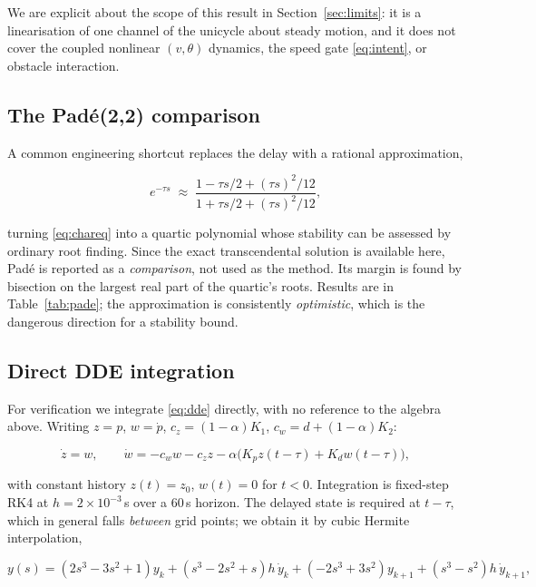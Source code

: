 \documentclass[11pt,a4paper]{article}
\theoremstyle{plain}
\theoremstyle{definition}
\begin{document}
We are explicit about the scope of this result in
Section~\ref{sec:limits}: it is a linearisation of one channel of the
unicycle about steady motion, and it does not cover the coupled
nonlinear $(v, \theta)$ dynamics, the speed gate \eqref{eq:intent}, or
obstacle interaction.

\subsection{The Pad\'e(2,2) comparison}
\label{sec:pade}

A common engineering shortcut replaces the delay with a rational
approximation,

\begin{equation}
e^{-\tau s} \;\approx\;
\frac{1 - \tau s/2 + (\tau s)^{2}/12}{1 + \tau s/2 + (\tau s)^{2}/12},
\label{eq:pade}
\end{equation}

turning \eqref{eq:chareq} into a quartic polynomial whose stability can
be assessed by ordinary root finding. Since the exact transcendental
solution is available here, Pad\'e is reported as a \emph{comparison},
not used as the method. Its margin is found by bisection on the largest
real part of the quartic's roots. Results are in
Table~\ref{tab:pade}; the approximation is consistently
\emph{optimistic}, which is the dangerous direction for a stability
bound.

\subsection{Direct DDE integration}
\label{sec:ddeint}

For verification we integrate \eqref{eq:dde} directly, with no reference
to the algebra above. Writing $z = p$, $w = \dot p$,
$c_z = (1-\alpha)K_1$, $c_w = d + (1-\alpha)K_2$:

\begin{equation}
\dot z = w,
\qquad
\dot w = -c_w w - c_z z - \alpha\bigl(K_p z(t-\tau) + K_d w(t-\tau)\bigr),
\end{equation}

with constant history $z(t) = z_0$, $w(t) = 0$ for $t < 0$.
Integration is fixed-step RK4 at $h = 2\times10^{-3}$\,s over a $60$\,s
horizon. The delayed state is required at $t - \tau$, which in general
falls \emph{between} grid points; we obtain it by cubic Hermite
interpolation,

\begin{equation}
y(s) = (2s^3 - 3s^2 + 1)y_k + (s^3 - 2s^2 + s)h\,\dot y_k
     + (-2s^3 + 3s^2)y_{k+1} + (s^3 - s^2)h\,\dot y_{k+1},
\label{eq:hermite}
\end{equation}
\end{document}
